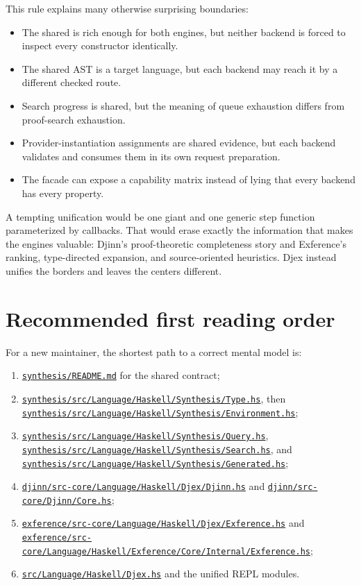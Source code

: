 \documentclass[10pt,letterpaper,oneside]{report}
\newcommand{\code}[1]{\texttt{\detokenize{#1}}}
\def\DjexBase{https://github.com/VladimirReshetnikov/Djex/blob/e454757d53ec057238c22fc6cd0d935b7d96b3dc/}
\newcommand{\dpath}[1]{\href{\DjexBase#1}{\nolinkurl{#1}}}
\begin{document}
This rule explains many otherwise surprising boundaries:

\begin{itemize}
  \item The shared \code{Type} is rich enough for both engines, but neither backend is forced to inspect every constructor identically.
  \item The shared \code{Generated} AST is a target language, but each backend may reach it by a different checked route.
  \item Search progress is shared, but the meaning of queue exhaustion differs from proof-search exhaustion.
  \item Provider-instantiation assignments are shared evidence, but each backend validates and consumes them in its own request preparation.
  \item The facade can expose a capability matrix instead of lying that every backend has every property.
\end{itemize}

\begin{designbox}
A tempting unification would be one giant \code{SearchState} and one generic step function parameterized by callbacks. That would erase exactly the information that makes the engines valuable: Djinn's proof-theoretic completeness story and Exference's ranking, type-directed expansion, and source-oriented heuristics. Djex instead unifies the borders and leaves the centers different.
\end{designbox}

\section{Recommended first reading order}

For a new maintainer, the shortest path to a correct mental model is:

\begin{enumerate}
  \item \dpath{synthesis/README.md} for the shared contract;
  \item \dpath{synthesis/src/Language/Haskell/Synthesis/Type.hs}, then \dpath{synthesis/src/Language/Haskell/Synthesis/Environment.hs};
  \item \dpath{synthesis/src/Language/Haskell/Synthesis/Query.hs}, \dpath{synthesis/src/Language/Haskell/Synthesis/Search.hs}, and \dpath{synthesis/src/Language/Haskell/Synthesis/Generated.hs};
  \item \dpath{djinn/src-core/Language/Haskell/Djex/Djinn.hs} and \dpath{djinn/src-core/Djinn/Core.hs};
  \item \dpath{exference/src-core/Language/Haskell/Djex/Exference.hs} and \dpath{exference/src-core/Language/Haskell/Exference/Core/Internal/Exference.hs};
  \item \dpath{src/Language/Haskell/Djex.hs} and the unified REPL modules.
\end{enumerate}
\end{document}
